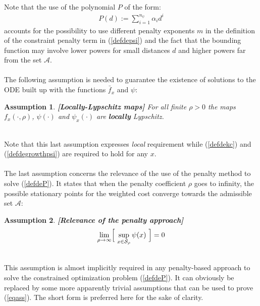 \documentclass{article}
\newtheorem{assumption}{\bf Assumption}
\begin{document}
\ \\
Note that the use of the polynomial $P$ of the form:
\begin{eqnarray}
P(d):=\sum_{i=1}^{n_\psi} \alpha_i d^i \label{defdePol} 
\end{eqnarray} 
accounts for the possibility to use different penalty exponents $m$ in the definition of the constraint penalty term in (\ref{defdepsi}) and the fact that the bounding function may involve lower powers for small distances $d$ and higher powers far from the set $\mathcal A$. \ \\ \ \\ 
The following assumption is needed to guarantee the existence of solutions to the ODE built up with the functions $\bar f_x$ and $\psi$:\\
\begin{assumption}{\bf [Locally-Lypschitz maps]} \label{ass4} 
For all finite $\rho>0$ the maps $f_x(\cdot,\rho)$, $\psi(\cdot)$ and $\psi_x(\cdot)$ are {\bf locally} Lypschitz.
\end{assumption}
\ \\
Note that this last assumption expresses {\em local} requirement while (\ref{defdekc}) and (\ref{defdegrowthpsi}) are required to hold for any $x$.\ \\ \ \\ 
The last assumption concerns the relevance of the use of the penalty method to solve (\ref{defdeP}). It states that when the penalty coefficient $\rho$ goes to infinity, the  possible stationary points for the weighted cost converge towards the admissible set $\mathcal A$:\\
\begin{assumption}{\bf [Relevance of the penalty approach]}\label{ass5} 
\begin{eqnarray}
\lim_{\rho\rightarrow \infty}\Bigl[\ \sup_{x\in \mathcal S_\rho}\psi(x)\ \Bigr]=0 \label{eqass} 
\end{eqnarray} 
\end{assumption}
\ \\ 
This assumption is almost implicitly required in any penalty-based approach to solve the constrained optimization problem (\ref{defdeP}). It can obviously be replaced by some more apparently trivial assumptions that can be used to prove (\ref{eqass}). The short form is preferred here for the sake of clarity.  
\end{document}
